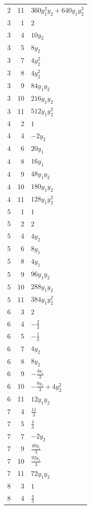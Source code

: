 \documentclass[10pt,a4paper]{article}
\begin{document}
{\begin{longtable}{rrp{125mm}}
2 & 11 & $360 y_{1}^{2} y_{2} + 640 y_{1} y_{2}^{3}$\\
3 & 1 & $2$\\
3 & 4 & $10 y_{2}$\\
3 & 5 & $8 y_{2}$\\
3 & 7 & $4 y_{2}^{2}$\\
3 & 8 & $4 y_{2}^{2}$\\
3 & 9 & $84 y_{1} y_{2}$\\
3 & 10 & $216 y_{1} y_{2}$\\
3 & 11 & $512 y_{1} y_{2}^{2}$\\
4 & 2 & $1$\\
4 & 4 & $- 2 y_{2}$\\
4 & 6 & $20 y_{1}$\\
4 & 8 & $16 y_{1}$\\
4 & 9 & $48 y_{1} y_{2}$\\
4 & 10 & $180 y_{1} y_{2}$\\
4 & 11 & $128 y_{1} y_{2}^{2}$\\
5 & 1 & $1$\\
5 & 2 & $2$\\
5 & 4 & $4 y_{2}$\\
5 & 6 & $8 y_{1}$\\
5 & 8 & $4 y_{1}$\\
5 & 9 & $96 y_{1} y_{2}$\\
5 & 10 & $288 y_{1} y_{2}$\\
5 & 11 & $384 y_{1} y_{2}^{2}$\\
6 & 3 & $2$\\
6 & 4 & $- \frac{2}{3}$\\
6 & 5 & $- \frac{1}{3}$\\
6 & 7 & $4 y_{2}$\\
6 & 8 & $8 y_{2}$\\
6 & 9 & $- \frac{4 y_{1}}{3}$\\
6 & 10 & $- \frac{8 y_{1}}{3} + 4 y_{2}^{2}$\\
6 & 11 & $12 y_{1} y_{2}$\\
7 & 4 & $\frac{11}{3}$\\
7 & 5 & $\frac{4}{3}$\\
7 & 7 & $- 2 y_{2}$\\
7 & 9 & $\frac{40 y_{1}}{3}$\\
7 & 10 & $\frac{92 y_{1}}{3}$\\
7 & 11 & $72 y_{1} y_{2}$\\
8 & 3 & $1$\\
8 & 4 & $\frac{4}{3}$\\

\end{longtable}}
\end{document}
